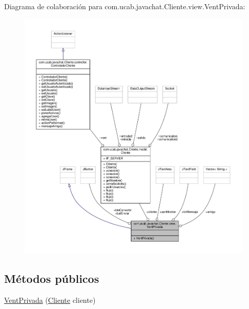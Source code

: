 Diagrama de colaboración para com.\-ucab.\-javachat.\-Cliente.\-view.\-Vent\-Privada\-:
\nopagebreak
\begin{figure}[H]
\begin{center}
\leavevmode
\includegraphics[width=350pt]{d1/d3b/classcom_1_1ucab_1_1javachat_1_1_cliente_1_1view_1_1_vent_privada__coll__graph}
\end{center}
\end{figure}
\subsection*{Métodos públicos}
\begin{DoxyCompactItemize}
\item 
\hyperlink{classcom_1_1ucab_1_1javachat_1_1_cliente_1_1view_1_1_vent_privada_aaa44d867cf18c8a0d5957af7592c5731}{Vent\-Privada} (\hyperlink{classcom_1_1ucab_1_1javachat_1_1_cliente_1_1model_1_1_cliente}{Cliente} cliente)
\end{DoxyCompactItemize}
